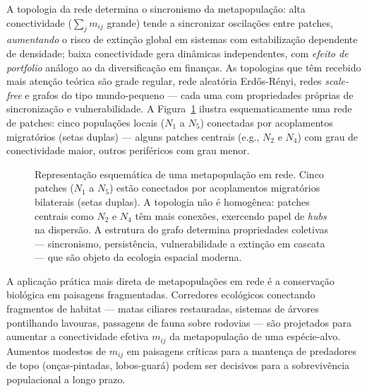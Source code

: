 A topologia da rede determina o sincronismo da metapopulação: alta
conectividade ($\sum_j m_{ij}$ grande) tende a sincronizar oscilações entre
patches, \emph{aumentando} o risco de extinção global em sistemas com
estabilização dependente de densidade; baixa conectividade gera dinâmicas
independentes, com \emph{efeito de portfolio} análogo ao da diversificação em
finanças. As topologias que têm recebido mais atenção teórica são grade
regular, rede aleatória Erdős-Rényi, redes \emph{scale-free} e grafos do
tipo mundo-pequeno --- cada uma com propriedades próprias de sincronização
e vulnerabilidade. A Figura~\ref{fig:10-metapop-network} ilustra
esquematicamente uma rede de patches: cinco populações locais ($N_1$ a
$N_5$) conectadas por acoplamentos migratórios (setas duplas) --- alguns
patches centrais (e.g., $N_2$ e $N_4$) com grau de conectividade maior,
outros periféricos com grau menor.

\begin{figure}[htbp]
\centering
{}
\caption{Representação esquemática de uma metapopulação em rede. Cinco patches ($N_1$ a $N_5$) estão conectados por acoplamentos migratórios bilaterais (setas duplas). A topologia não é homogênea: patches centrais como $N_2$ e $N_4$ têm mais conexões, exercendo papel de \emph{hubs} na dispersão. A estrutura do grafo determina propriedades coletivas --- sincronismo, persistência, vulnerabilidade a extinção em cascata --- que são objeto da ecologia espacial moderna.}
\label{fig:10-metapop-network}
\end{figure}

\begin{exemploenumv}
A aplicação prática mais direta de metapopulações em rede é a conservação
biológica em paisagens fragmentadas. Corredores ecológicos conectando
fragmentos de habitat --- matas ciliares restauradas, sistemas de árvores
pontilhando lavouras, passagens de fauna sobre rodovias --- são projetados
para aumentar a conectividade efetiva $m_{ij}$ da metapopulação de uma
espécie-alvo. Aumentos modestos de $m_{ij}$ em paisagens críticas para a
mantença de predadores de topo (onças-pintadas, lobos-guará) podem ser
decisivos para a sobrevivência populacional a longo prazo.
\end{exemploenumv}


